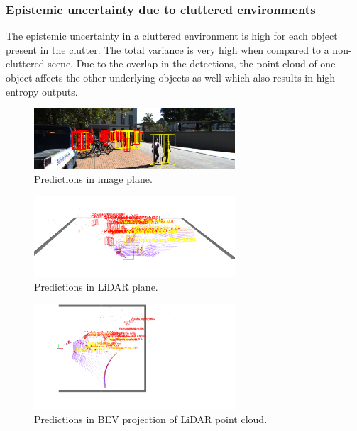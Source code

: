 \documentclass[10pt,twocolumn,letterpaper]{article}
\begin{document}
\subsubsection{Epistemic uncertainty due to cluttered environments}
The epistemic uncertainty in a cluttered environment is high for each object present in the clutter. The total variance is very high when compared to a non-cluttered scene. Due to the overlap in the detections, the point cloud of one object affects the other underlying objects as well which also results in high entropy outputs.
\begin{figure}[!htbp]
        \centering
		\includegraphics[width=75mm, scale = 0.4]{images/Uncertainty_results/5226_cluttered_bbox.png}
        \caption[Extracted frustum point cloud after Normalization]{Predictions in image plane.}
        \label{fig:Uncert_blockage-2_1}
\end{figure}
\begin{figure}[!htbp]
        \centering
		\includegraphics[width=75mm, scale = 0.4]{images/Uncertainty_results/5226_Follow_cam_view.png}
        \caption[Extracted frustum point cloud after Normalization]{Predictions in LiDAR plane.}
        \label{fig:Uncert_blockage-2_2}
\end{figure}
\begin{figure}[!htbp]
        \centering
		\includegraphics[width=75mm,scale = 0.4]{images/Uncertainty_results/5226_cluttered.png}
        \caption[Extracted frustum point cloud after Normalization]{Predictions in BEV projection of LiDAR point cloud.}
        \label{fig:Uncert_blockage-2_3}
\end{figure}
\end{document}
